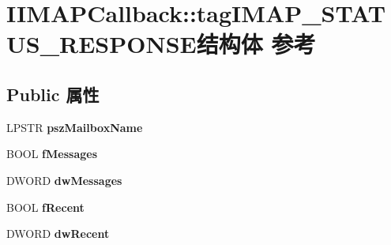 \hypertarget{struct_i_i_m_a_p_callback_1_1tag_i_m_a_p___s_t_a_t_u_s___r_e_s_p_o_n_s_e}{}\section{I\+I\+M\+A\+P\+Callback\+:\+:tag\+I\+M\+A\+P\+\_\+\+S\+T\+A\+T\+U\+S\+\_\+\+R\+E\+S\+P\+O\+N\+S\+E结构体 参考}
\label{struct_i_i_m_a_p_callback_1_1tag_i_m_a_p___s_t_a_t_u_s___r_e_s_p_o_n_s_e}
\subsection*{Public 属性}
\begin{DoxyCompactItemize}
\item 
\mbox{\label{struct_i_i_m_a_p_callback_1_1tag_i_m_a_p___s_t_a_t_u_s___r_e_s_p_o_n_s_e_a4740dc70090dcbcc4c0dc5ce6a72ee4a}} 
L\+P\+S\+TR {\bfseries psz\+Mailbox\+Name}
\item 
\mbox{\label{struct_i_i_m_a_p_callback_1_1tag_i_m_a_p___s_t_a_t_u_s___r_e_s_p_o_n_s_e_a97aea243a344e9f55701350660fc1721}} 
B\+O\+OL {\bfseries f\+Messages}
\item 
\mbox{\label{struct_i_i_m_a_p_callback_1_1tag_i_m_a_p___s_t_a_t_u_s___r_e_s_p_o_n_s_e_ada9bc16fb5a4a4fcde09e7d069e0a105}} 
D\+W\+O\+RD {\bfseries dw\+Messages}
\item 
\mbox{\label{struct_i_i_m_a_p_callback_1_1tag_i_m_a_p___s_t_a_t_u_s___r_e_s_p_o_n_s_e_aa8b4e9a95e7e164ac0decb97349c84a1}} 
B\+O\+OL {\bfseries f\+Recent}
\item 
\mbox{\label{struct_i_i_m_a_p_callback_1_1tag_i_m_a_p___s_t_a_t_u_s___r_e_s_p_o_n_s_e_a8732b87cfe9d5789c7f2e8c4c51eaa14}} 
D\+W\+O\+RD {\bfseries dw\+Recent}
\item 
\mbox{\label{struct_i_i_m_a_p_callback_1_1tag_i_m_a_p___s_t_a_t_u_s___r_e_s_p_o_n_s_e_aa4751406e18dedde708a8199fa0eaef1}} 

\end{DoxyCompactItemize}
